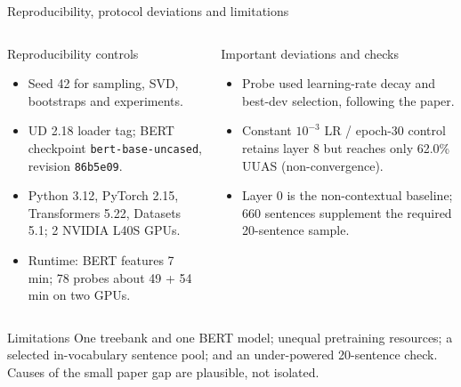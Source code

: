 \documentclass[aspectratio=169,9pt]{beamer}
\newcommand{\tightitem}{\setlength{\itemsep}{0.14em}\setlength{\parskip}{0pt}}
\begin{document}
\begin{frame}{Reproducibility, protocol deviations and limitations}
\begin{columns}[T,onlytextwidth]
  \begin{block}{Reproducibility controls}
    \begin{itemize}\tightitem
      \item Seed 42 for sampling, SVD, bootstraps and experiments.
      \item UD 2.18 loader tag; BERT checkpoint \texttt{bert-base-uncased}, revision \texttt{86b5e09}.
      \item Python 3.12, PyTorch 2.15, Transformers 5.22, Datasets 5.1; 2 NVIDIA L40S GPUs.
      \item Runtime: BERT features 7 min; 78 probes about 49 + 54 min on two GPUs.
    \end{itemize}
  \end{block}
  \begin{block}{Important deviations and checks}
    \begin{itemize}\tightitem
      \item Probe used learning-rate decay and best-dev selection, following the paper.
      \item Constant $10^{-3}$ LR / epoch-30 control retains layer 8 but reaches only 62.0\% UUAS (non-convergence).
      \item Layer 0 is the non-contextual baseline; 660 sentences supplement the required 20-sentence sample.
    \end{itemize}
  \end{block}
\end{columns}
\begin{alertblock}{Limitations}
One treebank and one BERT model; unequal pretraining resources; a selected in-vocabulary sentence pool; and an under-powered 20-sentence check. Causes of the small paper gap are plausible, not isolated.
\end{alertblock}
\end{frame}
\end{document}
